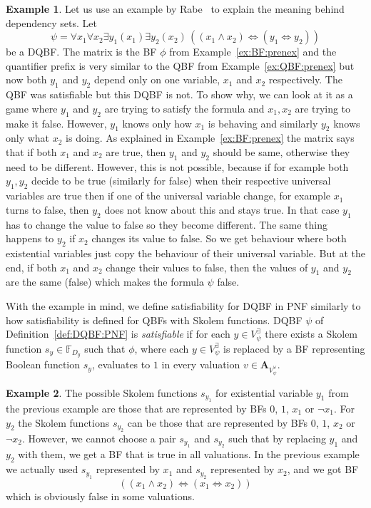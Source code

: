 \documentclass[
  digital, %
  color,
  twoside, %
  table,   %
  nolof,     %
  nolot,     %
]{fithesis3}
\theoremstyle{definition}
\newtheorem{example}{Example}
\theoremstyle{remark}
\newcommand{\valtns}[1]{\mathbf{A}_{#1}}
\newcommand{\BFuncs}[1]{\mathbb{F}_{#1}}
\newcommand{\evars}[1]{V_{#1}^{\exists}}
\newcommand{\uvars}[1]{V_{#1}^{\forall}}
\newcommand{\lequal}{\Leftrightarrow}
\newcommand{\itholds}{\,}
\begin{document}
\begin{example}
Let us use an example by Rabe~\cite{DQBFProofSystem} to explain the meaning behind dependency sets. Let 
\[\psi = \forall x_1 \forall x_2 \exists y_1 (x_1) \exists y_2 (x_2) \itholds ((x_1 \land x_2) \lequal (y_1 \lequal y_2))\]
be a DQBF. The matrix is the BF $\phi$ from Example~\ref{ex:BF:prenex} and the quantifier prefix is very similar to the QBF from Example~\ref{ex:QBF:prenex} but now both $y_1$ and $y_2$ depend only on one variable, $x_1$ and $x_2$ respectively. The QBF was satisfiable but this DQBF is not. To show why, we can look at it as a game where $y_1$  and $y_2$ are trying to satisfy the formula and $x_1,x_2$ are trying to make it false. However, $y_1$ knows only how $x_1$ is behaving and similarly $y_2$ knows only what $x_2$ is doing. As explained in Example~\ref{ex:BF:prenex} the matrix says that if both $x_1$ and $x_2$ are true, then $y_1$ and $y_2$ should be same, otherwise they need to be different. However, this is not possible, because if for example both $y_1,y_2$ decide to be true (similarly for false) when their respective universal variables are true then if one of the universal variable change, for example $x_1$ turns to false, then $y_2$ does not know about this and stays true. In that case $y_1$ has to change the value to false so they become different. The same thing happens to $y_2$ if $x_2$ changes its value to false. So we get behaviour where both existential variables just copy the behaviour of their universal variable. But at the end, if both $x_1$ and $x_2$ change their values to false, then the values of $y_1$ and $y_2$ are the same (false) which makes the formula $\psi$ false.
\end{example}

With the example in mind, we define satisfiability for DQBF in PNF similarly to how satisfiability is defined for QBFs with Skolem functions. DQBF $\psi$ of Definition~\ref{def:DQBF:PNF} is \emph{satisfiable} if for each $y \in \evars{\psi}$ there exists a Skolem function $s_y \in \BFuncs{D_y}$ such that $\phi$, where each $y \in \evars{\psi}$ is replaced by a BF representing Boolean function $s_y$, evaluates to $1$ in every valuation $v \in \valtns{\uvars{\psi}}$.

\begin{example}
The possible Skolem functions $s_{y_1}$ for existential variable $y_1$ from the previous example are those that are represented by BFs $0$, $1$, $x_1$ or $\neg x_1$. For $y_2$ the Skolem functions $s_{y_2}$ can be those that are represented by BFs $0$, $1$, $x_2$ or $\neg x_2$. However, we cannot choose a pair $s_{y_1}$ and $s_{y_2}$ such that by replacing $y_1$ and $y_2$ with them, we get a BF that is true in all valuations. In the previous example we actually used $s_{y_1}$ represented by $x_1$ and $s_{y_2}$ represented by $x_2$, and we got BF
\[((x_1 \land x_2) \lequal (x_1 \lequal x_2))\]
which is obviously false in some valuations.
\end{example}
\end{document}
